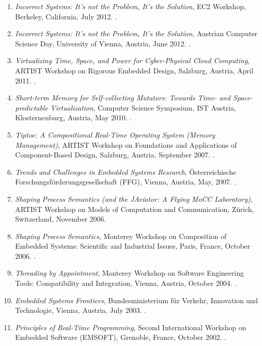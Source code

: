 {\begin{enumerate}
\item \emph{Incorrect Systems: It's not the Problem, It's the Solution},
EC2 Workshop, Berkeley, California, July 2012.
.

\item \emph{Incorrect Systems: It's not the Problem, It's the Solution},
Austrian Computer Science Day, University of Vienna, Austria, June 2012.
.

\item \emph{Virtualizing Time, Space, and Power for Cyber-Physical Cloud Computing},
ARTIST Workshop on Rigorous Embedded Design, Salzburg, Austria, April 2011.
.

\item \emph{Short-term Memory for Self-collecting Mutators: Towards Time- and Space-predictable Virtualization},
Computer Science Symposium, IST Austria, Klosterneuburg, Austria, May 2010.
.

\item \emph{Tiptoe: A Compositional Real-Time Operating System (Memory Management)},
ARTIST Workshop on Foundations and Applications of Component-Based Design, Salzburg, Austria, September 2007.
.

\item \emph{Trends and Challenges in Embedded Systems Research},
{\"O}sterreichische Forschungsf{\"o}rderungsgesellschaft (FFG), Vienna, Austria, May, 2007.
.

\item \emph{Shaping Process Semantics (and the JAviator: A Flying MoCC Laboratory)},
ARTIST Workshop on Models of Computation and Communication, Z{\"u}rich, Switzerland, November 2006.

\item \emph{Shaping Process Semantics},
Monterey Workshop on Composition of Embedded Systems: Scientific and Industrial Issues,
Paris, France, October 2006.
.

\item \emph{Threading by Appointment},
Monterey Workshop on Software Engineering Tools: Compatibility and Integration, Vienna, Austria, October 2004.
.

\item \emph{Embedded Systems Frontiers},
Bundesministerium f{\"u}r Verkehr, Innovation und Technologie, Vienna, Austria, July 2003.
.

\item \emph{Principles of Real-Time Programming},
Second International Workshop on Embedded Software (EMSOFT), Grenoble, France, October 2002.
.
\end{enumerate}
}

